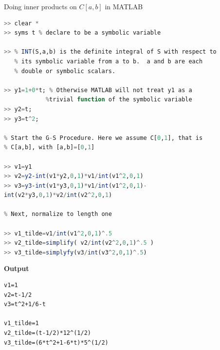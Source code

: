 \begin{example}
Doing inner products on $C[a,b]$ in MATLAB







\begin{lstlisting}[language=Julia,style=mystyle]
>> clear *
>> syms t % declare to be a symbolic variable

>> % INT(S,a,b) is the definite integral of S with respect to
   % its symbolic variable from a to b.  a and b are each
   % double or symbolic scalars.

>> y1=1+0*t; % Otherwise MATLAB will not treat y1 as a 
            %trivial function of the symbolic variable 
>> y2=t;
>> y3=t^2;

% Start the G-S Procedure. Here we assume C[0,1], that is
% C[a,b], with [a,b]=[0,1]

>> v1=y1
>> v2=y2-int(v1*y2,0,1)*v1/int(v1^2,0,1)
>> v3=y3-int(v1*y3,0,1)*v1/int(v1^2,0,1)-
int(v2*y3,0,1)*v2/int(v2^2,0,1)

% Next, normalize to length one

>> v1_tilde=v1/int(v1^2,0,1)^.5
>> v2_tilde=simplify( v2/int(v2^2,0,1)^.5 )
>> v3_tilde=simplyfy(v3/int(v3^2,0,1)^.5)
\end{lstlisting}
\textbf{Output} 
\begin{verbatim}
v1=1
v2=t-1/2
v3=t^2+1/6-t

v1_tilde=1
v2_tilde=(t-1/2)*12^(1/2)
v3_tilde=(6*t^2+1-6*t)*5^(1/2)
 \end{verbatim}
 
 \end{example}

